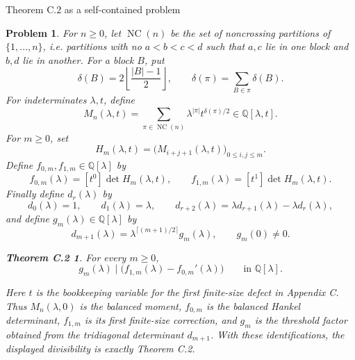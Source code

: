 \documentclass[11pt]{article}
\newtheorem*{problem}{Problem}
\newtheorem*{theoremC}{Theorem C.2}
\DeclareMathOperator{\NC}{NC}
\begin{document}
\begin{center}
{\Large Theorem C.2 as a self-contained problem}
\end{center}

\begin{problem}
For \(n\ge0\), let \(\NC(n)\) be the set of noncrossing partitions of
\(\{1,\ldots,n\}\), i.e. partitions with no \(a<b<c<d\) such that
\(a,c\) lie in one block and \(b,d\) lie in another.  For a block \(B\), put
\[
  \delta(B)=2\left\lfloor\frac{|B|-1}{2}\right\rfloor,
  \qquad
  \delta(\pi)=\sum_{B\in\pi}\delta(B).
\]
For indeterminates \(\lambda,t\), define
\[
  M_n(\lambda,t)
  =
  \sum_{\pi\in\NC(n)}
    \lambda^{|\pi|}t^{\delta(\pi)/2}
  \in \mathbb Q[\lambda,t].
\]
For \(m\ge0\), set
\[
  H_m(\lambda,t)
  =
  \bigl(M_{i+j+1}(\lambda,t)\bigr)_{0\le i,j\le m}.
\]
Define \(f_{0,m},f_{1,m}\in\mathbb Q[\lambda]\) by
\[
  f_{0,m}(\lambda)=[t^0]\det H_m(\lambda,t),
  \qquad
  f_{1,m}(\lambda)=[t^1]\det H_m(\lambda,t).
\]
Finally define \(d_r(\lambda)\) by
\[
  d_0(\lambda)=1,\qquad
  d_1(\lambda)=\lambda,\qquad
  d_{r+2}(\lambda)=\lambda d_{r+1}(\lambda)-\lambda d_r(\lambda),
\]
and define \(g_m(\lambda)\in\mathbb Q[\lambda]\) by
\[
  d_{m+1}(\lambda)
  =
  \lambda^{\lceil (m+1)/2\rceil}g_m(\lambda),
  \qquad g_m(0)\ne0.
\]

\begin{theoremC}
For every \(m\ge0\),
\[
  g_m(\lambda)\mid
  \bigl(f_{1,m}(\lambda)-f_{0,m}'(\lambda)\bigr)
  \qquad\text{in }\mathbb Q[\lambda].
\]
\end{theoremC}

Here \(t\) is the bookkeeping variable for the first finite-size defect in
Appendix C.  Thus \(M_n(\lambda,0)\) is the balanced moment, \(f_{0,m}\) is the
balanced Hankel determinant, \(f_{1,m}\) is its first finite-size correction,
and \(g_m\) is the threshold factor obtained from the tridiagonal determinant
\(d_{m+1}\).  With these identifications, the displayed divisibility is exactly
Theorem C.2.
\end{problem}
\end{document}
